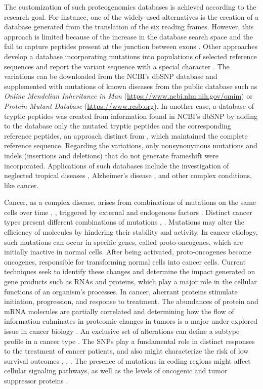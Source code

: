 \documentclass{ieeeaccess}
\begin{document}
The customization of such proteogenomics databases is achieved according to the research goal. For instance, one of the widely used alternatives is the creation of a database generated from the translation of the six reading frames. However, this approach is limited because of the increase in the database search space and the fail to capture peptides present at the junction between exons \cite{Nesvizhskii2014-ej, Renuse2011-wl}. Other approaches develop a database incorporating mutations into populations of selected reference sequences and report the variant sequence with a special character \cite{Schandorff2007-ro}. The variations can be downloaded from the NCBI's dbSNP database and supplemented with mutations of known diseases from the public database such as \textit{Online Mendelian Inheritance in Man} (\url{https://www.ncbi.nlm.nih.gov/omim}) or \textit{Protein Mutant Database} (\url{https://www.rcsb.org}). In another case, a database of tryptic peptides was created from information found in NCBI's dbSNP \cite{Bunger2007-yo} by adding to the database only the mutated tryptic peptides and the corresponding reference peptides, an approach distinct from \cite{Schandorff2007-ro}, which maintained the complete reference sequence. Regarding the variations, only nonsynonymous mutations and indels (insertions and deletions) that do not generate frameshift were incorporated. Applications of such databases include the investigation of neglected tropical diseases \cite{Pawar2014-gl}, Alzheimer's disease \cite{Da_Silva2021-cq}, and other complex conditions, like cancer. 

Cancer, as a complex disease, arises from combinations of mutations on the same cells over time \cite{Hahn2002-bo}, \cite{Whitworth2016-lr}, triggered by external and endogenous factors \cite{Eccles2016-yq,Adi-Kusumo2016-cd}. Distinct cancer types present different combinations of mutations \cite{Hahn2002-bo}, \cite{Whitworth2016-lr}. Mutations may alter the efficiency of molecules by hindering their stability and activity. In cancer etiology, such mutations can occur in specific genes, called proto-oncogenes, which are initially inactive in normal cells. After being activated, proto-oncogenes become oncogenes, responsible for transforming normal cells into cancer cells. Current techniques seek to identify these changes and determine the impact generated on gene products such as RNAs and proteins, which play a major role in the cellular functions of an organism's processes. In cancer, aberrant proteins stimulate initiation, progression, and response to treatment. The abundances of protein and mRNA molecules are partially correlated and determining how the flow of information culminates in proteomic changes in tumors is a major under-explored issue in cancer biology \cite{Alfaro2014-dg}. An exclusive set of alterations can define a subtype profile in a cancer type \cite{Redei2008,Hahn2002-bo}. The SNPs play a fundamental role in distinct responses to the treatment of cancer patients, and also might characterize the risk of low survival outcomes \cite{Hahn2002-bo}, \cite{Whitworth2016-lr}, \cite{Deng2017-kq}. The presence of mutations in coding regions might affect cellular signaling pathways, as well as the levels of oncogenic and tumor suppressor proteins \cite{Deng2017-kq}. 
\end{document}
